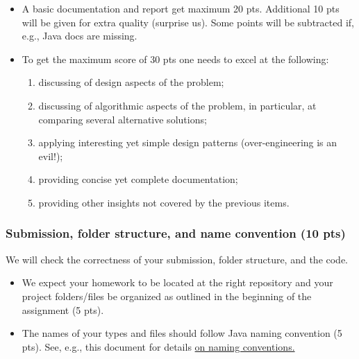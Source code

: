 \begin{itemize}

\item A basic documentation and report get maximum 20 pts.
Additional 10 pts will be given for extra quality (surprise us).
Some points will be subtracted if, e.g., Java docs are missing.

\item To get the maximum score of 30 pts one needs to
excel at the following:

\begin{enumerate}
\item discussing of design aspects of the problem;
\item discussing of algorithmic aspects of the problem, in particular,
at comparing several alternative solutions;
\item applying interesting yet simple design patterns (over-engineering is an evil!);
\item providing concise yet complete documentation;
\item providing other insights not covered by the previous items.
\end{enumerate}

\end{itemize}

\subsubsection{Submission, folder structure, and name convention (10 pts)}
We will check the correctness of your submission, folder structure,
and the code.

\begin{itemize}

\item We expect your homework to be located at the right repository 
and your project folders/files be organized as outlined in
the beginning of the assignment (5 pts). 

\item The names of your types and files should follow Java naming convention (5 pts). 
See, e.g., this document for details \href{http://java.about.com/od/javasyntax/a/nameconventions.htm}{on naming conventions.}


\end{itemize}
